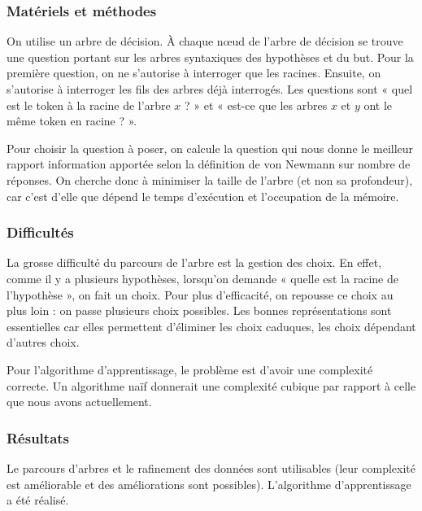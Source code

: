 \documentclass[a4paper,10pt]{article}
\begin{document}
\subsubsection{Matériels et méthodes}

On utilise un arbre de décision. À chaque n\oe{}ud de l'arbre de décision se trouve une question portant sur les arbres syntaxiques des hypothèses et du but. Pour la première question, on ne s'autorise à interroger que les racines. Ensuite, on s'autorise à interroger les fils des arbres déjà interrogés. Les questions sont « quel est le token à la racine de l'arbre $x$ ? » et « est-ce que les arbres $x$ et $y$ ont le même token en racine ? ».

Pour choisir la question à poser, on calcule la question qui nous donne le meilleur rapport information apportée selon la définition de von Newmann sur nombre de réponses. On cherche donc à minimiser la taille de l'arbre (et non sa profondeur), car c'est d'elle que dépend le temps d'exécution et l'occupation de la mémoire.

\subsubsection{Difficultés}  %
La grosse difficulté du parcours de l'arbre est la gestion des choix. En effet, comme il y a plusieurs hypothèses, lorsqu'on demande « quelle est la racine de l'hypothèse », on fait un choix. Pour plus d'efficacité, on repousse ce choix au plus loin : on passe plusieurs choix possibles. Les bonnes représentations sont essentielles car elles permettent d'éliminer les choix caduques, les choix dépendant d'autres choix.

Pour l'algorithme d'apprentissage, le problème est d'avoir une complexité correcte. Un algorithme naïf donnerait une complexité cubique par rapport à celle que nous avons actuellement. %

\subsubsection{Résultats}
Le parcours d'arbres et le rafinement des données sont utilisables (leur complexité est améliorable et des améliorations sont possibles). L'algorithme d'apprentissage a été réalisé.

\nocite{*}
{}



\end{document}
